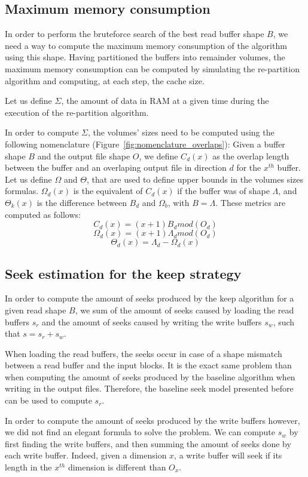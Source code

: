 \documentclass[sigconf, nonacm]{acmart}
\begin{document}
\subsection{Maximum memory consumption}
In order to perform the bruteforce search of the best read buffer shape $B$,
we need a way to compute the maximum memory consumption of the algorithm using
this shape.
Having partitioned the buffers into remainder volumes, the maximum memory
consumption can be computed by simulating the re-partition algorithm and
computing, at each step, the cache size.

Let us define $\Sigma$, the amount of data in RAM at a given time during the
execution of the re-partition algorithm.

In order to compute $\Sigma$, the volumes' sizes need to be computed using the
following nomenclature (Figure~\ref{fig:nomenclature_overlaps}):
Given a buffer shape $B$ and the output file shape $O$, we define $C_d(x)$ as
the overlap length between the buffer and an overlaping output file in direction
$d$ for the $x^{th}$ buffer. Let us define $\Omega$ and $\Theta$, that are used
to define upper bounds in the volumes sizes formulas. $\Omega_d(x)$ is the
equivalent of $C_d(x)$ if the buffer was of shape $\Lambda$, and $\Theta_k(x)$
is the difference between $B_d$ and $\Omega_b$, with $B=\Lambda$.
These metrics are computed as follows:
$$C_d(x) = (x+1)B_d mod(O_d)$$
$$\Omega_d(x) = (x+1)\Lambda_d mod(O_d)$$
$$\Theta_d(x) = \Lambda_d - \Omega_d(x)$$

\subsection{Seek estimation for the keep strategy}
In order to compute the amount of seeks produced by the keep algorithm
for a given read shape $B$, we sum of the amount of seeks caused by loading the
read buffers $s_r$ and the amount of seeks caused by writing the write
buffers $s_w$, such that $s=s_r+s_w$.

When loading the read buffers, the seeks occur in case of a shape mismatch
between a read buffer and the input blocks. It is the exact same problem than
when computing the amount of seeks produced by the baseline algorithm when
writing in the output files. Therefore, the baseline seek model presented
before can be used to compute $s_r$.

In order to compute the amount of seeks produced by the write buffers however,
we did not find an elegant formula to solve the problem. We can compute $s_w$
by first finding the write buffers, and then summing the amount of seeks done
by each write buffer. Indeed, given a dimension $x$, a write buffer will seek
if its length in the $x^{th}$ dimension is different than $O_x$.
\end{document}
